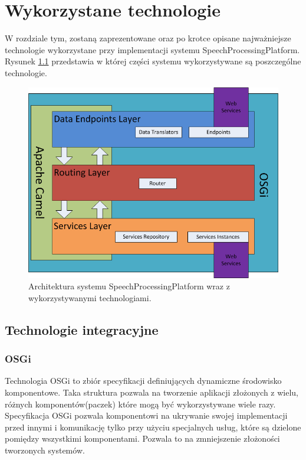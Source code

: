 \ifpdf
    \graphicspath{{3/figures/PNG/}{3/figures/PDF/}{3/figures/}}
\else
    \graphicspath{{3/figures/EPS/}{3/figures/}}
\fi
\chapter{Wykorzystane technologie} %


W rozdziale tym, zostaną zaprezentowane oraz po krotce opisane najważniejsze technologie wykorzystane przy implementacji systemu SpeechProcessingPlatform. Rysunek \ref{fig:architecture_and_technologies} przedstawia w której części systemu wykorzystywane są poszczególne technologie.

\begin{figure}[!h]
	\centering
	\includegraphics[scale=0.45]{layered_architecture_and_technologies.png} 
	\caption{Architektura systemu SpeechProcessingPlatform wraz z wykorzystywanymi technologiami.}
\label{fig:architecture_and_technologies}
\end{figure}

\section{Technologie integracyjne}
\subsection{OSGi}
Technologia OSGi to zbiór specyfikacji definiujących dynamiczne środowisko komponentowe. Taka struktura pozwala na tworzenie aplikacji złożonych z wielu, różnych komponentów(paczek) które mogą być wykorzystywane wiele razy. Specyfikacja OSGi pozwala komponentowi na ukrywanie swojej implementacji przed innymi i komunikację tylko przy użyciu specjalnych usług, które są dzielone pomiędzy wszystkimi komponentami. Pozwala to na zmniejszenie złożoności tworzonych systemów.

